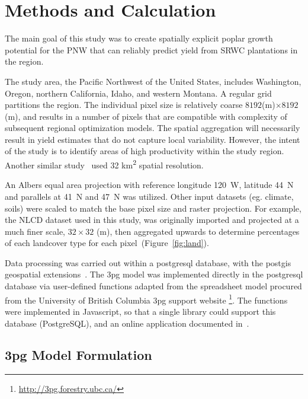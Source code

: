 \documentclass[preprint,12pt]{elsarticle}
\begin{document}
\section{Methods and Calculation}

The main goal of this study was to create spatially explicit poplar
growth potential for the \ac{PNW} that can reliably predict yield
from \ac{SRWC} plantations in the region.

The study area, the Pacific Northwest of the United States, includes
Washington, Oregon, northern California, Idaho, and western Montana.
A regular grid partitions the region.  The individual pixel size is
relatively coarse $8192$(m)$ \times 8192$(m), and results in a number
of pixels that are compatible with complexity of subsequent regional
optimization models. The spatial aggregation will necessarily result
in yield estimates that do not capture local variability. However, the
intent of the study is to identify areas of high productivity within
the study region. Another similar study~\cite{Headlee2012} used 32
km\textsuperscript{2} spatial resolution.

An Albers equal area projection with reference longitude 120\degree~W,
latitude 44\degree~N and parallels at 41\degree~N and 47\degree~N was
utilized.
Other input datasets (eg. climate, soils) were scaled to match the base
pixel size and raster projection. For example, the \ac{NLCD} dataset
used in this study, was originally imported and projected at a much
finer scale, $32 \times 32$ (m), then aggregated upwards to determine
percentages of each landcover type for each
pixel~(Figure~\ref{fig:land}).

Data processing was carried out within a postgresql database, with the
postgis geospatial extensions~\cite{pgsql,Holl2009,postgis}.  The
\ac{3pg} model was implemented directly in the postgresql database via
user-defined functions adapted from the spreadsheet model procured
from the University of British Columbia \ac{3pg} support website
\footnote{\href{http://3pg.forestry.ubc.ca/}{http://3pg.forestry.ubc.ca/}}.
The functions were implemented in Javascript, so that a single library
could support this database (PostgreSQL), and an online application
documented in~\cite{Prilepova2014}.

\subsection{\acs{3pg} Model Formulation}
\label{sec:3pg}
\end{document}
